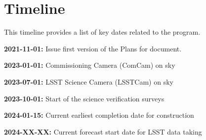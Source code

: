 \section{Timeline} \label{sec:timeline}

This timeline provides a list of key dates  related to the \es program. 

{\bf 2021-11-01:} Issue first version of the \ro Plans for \es document. 

{\bf 2023-01-01:} Commissioning Camera (ComCam) on sky

{\bf 2023-07-01:} LSST Science Camera (LSSTCam) on sky

{\bf 2023-10-01:} Start of the science verification surveys

{\bf 2024-01-15:} Current earliest completion date for construction

{\bf 2024-XX-XX:} Current forecast start date for LSST data taking

